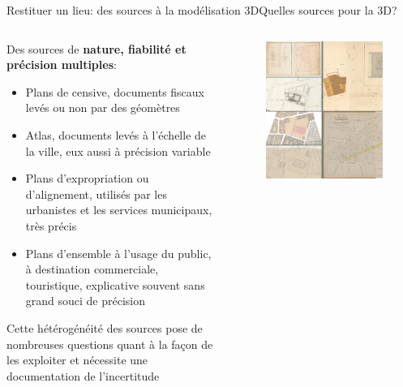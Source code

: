 \documentclass[8pt]{beamer}
\begin{document}
\begin{frame}{Restituer un lieu: des sources à la modélisation 3D}{Quelles sources pour la 3D?}
	\begin{columns}[c]
		\begin{column}{0.5\textwidth}
			Des sources de \textbf{nature, fiabilité et précision multiples}:
			\begin{itemize}
				\item Plans de censive, documents fiscaux levés ou non par des géomètres
				\item Atlas, documents levés à l’échelle de la ville, eux aussi à précision variable
				\item Plans d’expropriation ou d’alignement, utilisés par les urbanistes et les services municipaux, très précis
				\item Plans d’ensemble à l’usage du public, à destination commerciale, touristique, explicative souvent sans grand souci de précision
			\end{itemize}
			Cette hétérogénéité des sources pose de nombreuses questions quant à la façon de les exploiter et nécessite une documentation de l’incertitude
		\end{column}
		\begin{column}{0.5\textwidth}
			\begin{figure}
				\includegraphics[width=\textwidth]{includes/c_slide1.png}
			\end{figure}
		\end{column}
	\end{columns}
\end{frame}
\end{document}

